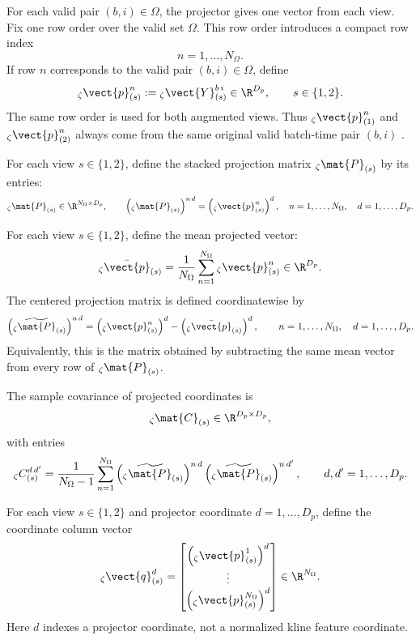 For each valid pair $(b,i)\in\Omega$, the projector gives one vector from each
view.  Fix one row order over the valid set $\Omega$.  This row order introduces
a compact row index
\[
  n=1,\ldots,N_{\Omega}.
\]
If row $n$ corresponds to the valid pair $(b,i)\in\Omega$, define
\[
  {}_{\zeta}\vect{p}_{(s)}^{n}
  :=
  {}_{\zeta}\vect{Y}_{(s)}^{b\,i}
  \in
  \R^{D_p},
  \qquad
  s\in\{1,2\}.
\]
The same row order is used for both augmented views.  Thus
${}_{\zeta}\vect{p}_{(1)}^{n}$ and
${}_{\zeta}\vect{p}_{(2)}^{n}$ always come from the same original valid
batch-time pair $(b,i)$%
.

For each view $s\in\{1,2\}$, define the stacked projection matrix
${}_{\zeta}\mat{P}_{(s)}$ by its entries:
\[
  {}_{\zeta}\mat{P}_{(s)}
  \in
  \R^{N_{\Omega}\times D_p},
  \qquad
  \left(
    {}_{\zeta}\mat{P}_{(s)}
  \right)^{n\,d}
  =
  \left(
    {}_{\zeta}\vect{p}_{(s)}^{n}
  \right)^{d},
  \quad
  n=1,\ldots,N_{\Omega},
  \quad
  d=1,\ldots,D_p.
\]

For each view $s\in\{1,2\}$, define the mean projected vector:
\[
  {}_{\zeta}\bar{\vect{p}}_{(s)}
  =
  \frac{1}{N_{\Omega}}
  \sum_{n=1}^{N_{\Omega}}
  {}_{\zeta}\vect{p}_{(s)}^{n}
  \in
  \R^{D_p}.
\]
The centered projection matrix is defined coordinatewise by
\[
  \left(
    {}_{\zeta}\widetilde{\mat{P}}_{(s)}
  \right)^{n\,d}
  =
  \left(
    {}_{\zeta}\vect{p}_{(s)}^{n}
  \right)^{d}
  -
  \left(
    {}_{\zeta}\bar{\vect{p}}_{(s)}
  \right)^{d},
  \qquad
  n=1,\ldots,N_{\Omega},
  \quad
  d=1,\ldots,D_p.
\]
Equivalently, this is the matrix obtained by subtracting the same mean vector
from every row of ${}_{\zeta}\mat{P}_{(s)}$.

The sample covariance of projected coordinates is
\[
  {}_{\zeta}\mat{C}_{(s)}
  \in
  \R^{D_p\times D_p},
\]
with entries
\[
  {}_{\zeta}C_{(s)}^{d\,d'}
  =
  \frac{1}{N_{\Omega}-1}
  \sum_{n=1}^{N_{\Omega}}
  \left(
    {}_{\zeta}\widetilde{\mat{P}}_{(s)}
  \right)^{n\,d}
  \left(
    {}_{\zeta}\widetilde{\mat{P}}_{(s)}
  \right)^{n\,d'},
  \qquad
  d,d'=1,\ldots,D_p.
\]

For each view $s\in\{1,2\}$ and projector coordinate
$d=1,\ldots,D_p$, define the coordinate column vector
\[
  {}_{\zeta}\vect{q}_{(s)}^{d}
  =
  \begin{bmatrix}
    \left({}_{\zeta}\vect{p}_{(s)}^{1}\right)^{d}\\
    \vdots\\
    \left({}_{\zeta}\vect{p}_{(s)}^{N_{\Omega}}\right)^{d}
  \end{bmatrix}
  \in
  \R^{N_{\Omega}}.
\]
Here $d$ indexes a projector coordinate, not a normalized kline feature
coordinate.


